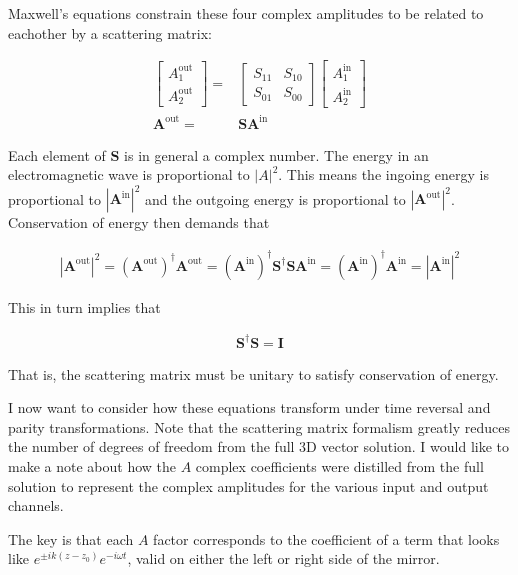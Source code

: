 \documentclass[12pt]{article}
\newcommand{\bv}[1]{\boldsymbol{#1}}
\begin{document}
Maxwell's equations constrain these four complex amplitudes to be related to eachother by a scattering matrix:

\begin{align}
\begin{bmatrix}
A_1^{\text{out}} \\ A_2^{\text{out}}
\end{bmatrix}
=&
\begin{bmatrix}
S_{11} & S_{10} \\
S_{01} & S_{00}
\end{bmatrix}
\begin{bmatrix}
A_1^{\text{in}} \\ A_2^{\text{in}}
\end{bmatrix}\\
\bv{A}^{\text{out}} =& \bv{S}\bv{A}^{\text{in}}
\end{align}

Each element of $\bv{S}$ is in general a complex number.
The energy in an electromagnetic wave is proportional to $|A|^2$.
This means the ingoing energy is proportional to $|\bv{A}^{\text{in}}|^2$ and the outgoing energy is proportional to $|\bv{A}^{\text{out}}|^2$.
Conservation of energy then demands that

\begin{align}
|\bv{A}^{\text{out}}|^2 = \left(\bv{A}^{\text{out}}\right)^{\dagger}\bv{A}^{\text{out}} = \left(\bv{A}^{\text{in}}\right)^{\dagger}\bv{S}^{\dagger}\bv{S}\bv{A}^{\text{in}} = \left(\bv{A}^{\text{in}}\right)^{\dagger}\bv{A}^{\text{in}} = |\bv{A}^{\text{in}}|^2
\end{align}

This in turn implies that

\begin{align}
\bv{S}^{\dagger}\bv{S} = \bv{I}
\end{align}

That is, the scattering matrix must be unitary to satisfy conservation of energy.

I now want to consider how these equations transform under time reversal and parity transformations. 
Note that the scattering matrix formalism greatly reduces the number of degrees of freedom from the full 3D vector solution. 
I would like to make a note about how the $A$ complex coefficients were distilled from the full solution to represent the complex amplitudes for the various input and output channels.

The key is that each $A$ factor corresponds to the coefficient of a term that looks like $e^{\pm ik(z-z_0)}e^{-i\omega t}$, valid on either the left or right side of the mirror.
\end{document}

